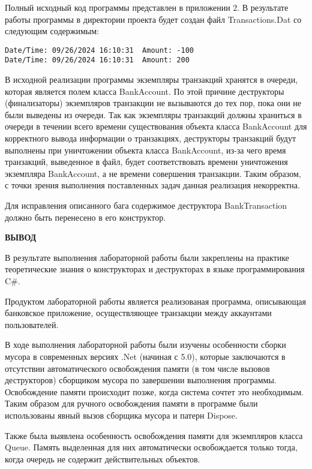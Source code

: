     Полный исходный код программы представлен в приложении 2.
    В результате работы программы в директории проекта будет создан файл Transactions.Dat со следующим содержимым:
\begingroup
\fontsize{12pt}{12pt}\selectfont
\linespread{1.5}
\begin{verbatim}
Date/Time: 09/26/2024 16:10:31	Amount: -100
Date/Time: 09/26/2024 16:10:31	Amount: 200
\end{verbatim}  
\endgroup
    В исходной реализации программы экземпляры транзакций хранятся в очереди, которая является полем класса BankAccount.
    По этой причине деструкторы (финализаторы) экземпляров транзакции не вызываются до тех пор, пока они не были выведены из очереди.
    Так как экземпляры транзакций должны храниться в очереди в течении всего времени существования объекта класса BankAccount для корректного вывода информации о транзакциях, деструкторы транзакций будут выполнены при уничтожении объекта класса BankAccount, из-за чего время транзакций, выведенное в файл, будет соответствовать времени уничтожения экземпляра BankAccount, а не времени совершения транзакции.
    Таким образом, с точки зрения выполнения поставленных задач данная реализация некорректна.
    
    Для исправления описанного бага содержимое деструктора BankTransaction должно быть перенесено в его конструктор.


\newpage
{\bfseries {ВЫВОД}}

В результате выполнения лабораторной работы были закреплены на практике теоретические знания о конструкторах и деструкторах в языке программирования C\#.

Продуктом лабораторной работы является реализованая программа, описывающая банковское приложение, осуществляющее транзакции между аккаунтами пользователей.

В ходе выполнения лабораторной работы были изучены особенности сборки мусора в современных версиях .Net (начиная с 5.0), которые заключаются в отсутствии автоматического освобождения памяти (в том числе вызовов деструкторов) сборщиком мусора по завершении выполнения программы.
Освобождение памяти происходит позже, когда система сочтет это необходимым. 
Таким образом для ручного освобождения памяти в программе были использованы явный вызов сборщика мусора и патерн Dispose.

Также была выявлена особенность освобождения памяти для экземпляров класса Queue. 
Память выделенная для них автоматически освобождается только тогда, когда очередь не содержит действительных объектов.

